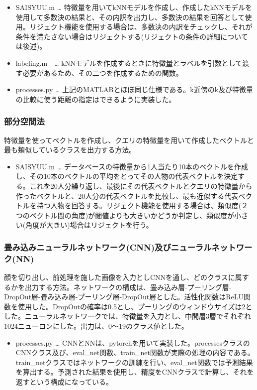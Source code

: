 \documentclass[10.5pt,a4j]{jarticle}
\begin{document}
	\begin{itemize}
		\item SAISYUU.m … 特徴量を用いてkNNモデルを作成し、作成したkNNモデルを使用して多数決の結果と、その内訳を出力し、多数決の結果を回答として使用。リジェクト機能を使用する場合は、多数決の内訳をチェックし、それが条件を満たさない場合はリジェクトする(リジェクトの条件の詳細については後述)。
		\item labeling.m　… kNNモデルを作成するときに特徴量とラベルを引数として渡す必要があるため、その二つを作成するための関数。
		\item processes.py … 上記のMATLABとほぼ同じ仕様である。k近傍のk及び特徴量の比較に使う距離の指定はできるように実装した。
	\end{itemize}
	\subsubsection{部分空間法}
	特徴量を使ってベクトルを作成し、クエリの特徴量を用いて作成したベクトルと最も類似しているクラスを出力する方法。

	\begin{itemize}
		\item SAISYUU.m … データベースの特徴量から1人当たり10本のベクトルを作成し、その10本のベクトルの平均をとってその人物の代表ベクトルを決定する。これを20人分繰り返し、最後にその代表ベクトルとクエリの特徴量から作ったベクトルと、20人分の代表ベクトルを比較し、最も近似する代表ベクトルを持つ人物を回答する。リジェクト機能を使用する場合は、類似度(２つのベクトル間の角度)が閾値よりも大きいかどうか判定し、類似度が小さい(角度が大きい)場合はリジェクトを行う。
	\end{itemize}
	\subsubsection{畳み込みニューラルネットワーク(CNN)及びニューラルネットワーク(NN)}
	顔を切り出し、前処理を施した画像を入力としCNNを通し、どのクラスに属するかを出力する方法。ネットワークの構成は、畳み込み層-プーリング層-DropOut層-畳み込み層-プーリング層-DropOut層とした。活性化関数はReLU関数を使用した。DropOutの確率は0.5とし、プーリングのウィンドウサイズは2とした。ニューラルネットワークでは、特徴量を入力とし、中間層3層でそれぞれ1024ニューロンにした。出力は、0〜19のクラス値とした。

	\begin{itemize}
		\item processes.py … CNNとNNは、pytorchを用いて実装した。processesクラスのCNNクラス及び、eval\_net関数、train\_net関数が実際の処理の内容である。train\_netクラスではネットワークの訓練を行い、eval\_net関数では予測結果を算出する。予測された結果を使用し、精度をCNNクラスで計算し、それを返すという構成になっている。
	\end{itemize}
\end{document}
